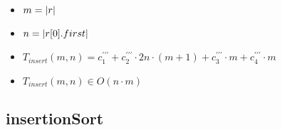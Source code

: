 \documentclass{article}
\begin{document}
    \begin{minipage}{0.70\textwidth}
        
    \end{minipage}
    \hfill
    \begin{minipage}{0.25\textwidth}
    \end{minipage}

    \begin{itemize}
        \item $m = |r|$
        \item $n = |r[0].first|$
        \item $T_{insert}(m, n) = c^{\prime\prime\prime}_1 +
                               c^{\prime\prime\prime}_2 \cdot 2n \cdot (m+1) +
                               c^{\prime\prime\prime}_3 \cdot m +
                               c^{\prime\prime\prime}_4 \cdot m $
        \item $T_{insert}(m, n) \in O(n \cdot m)$
    \end{itemize}

    \subsection*{insertionSort}
\end{document}
